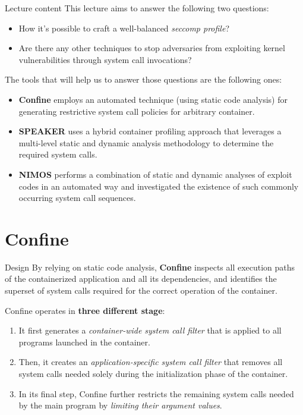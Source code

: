 \documentclass{beamer}
\begin{document}
\begin{frame}{Lecture content}
This lecture aims to answer the following two questions:
\begin{itemize}

 \item How it's possible to craft a well-balanced \emph{seccomp profile}?\\

 \item Are there any other techniques to stop adversaries from exploiting kernel vulnerabilities through system call invocations?
\end{itemize}
\vspace{0.3cm}
The tools that will help us to answer those questions are the following ones:

\begin{itemize}

 \item \textbf{Confine} employs an automated technique (using static code analysis) for generating restrictive system call policies for arbitrary container. \\

 \item \textbf{SPEAKER} uses a hybrid container profiling approach that leverages a multi-level static and dynamic analysis methodology to determine the required system calls.\\
 
 \item \textbf{NIMOS} performs a combination of static and dynamic analyses of exploit codes in an automated way and investigated the existence of such commonly occurring system call sequences.
\end{itemize}

\end{frame}

\section{Confine}

\begin{frame}{Design}
By relying on static code analysis, \textbf{Confine} inspects all execution paths of the containerized application and all its dependencies, and identifies the superset of system calls required for the correct operation of the container.

\vspace{0.35cm}
Confine operates in \textbf{three different stage}:
\begin{enumerate}
    \item It first generates a \emph{container-wide system call filter} that is applied to all programs launched in the container. 
    \item Then, it creates an \emph{application-specific system call filter} that removes all system calls needed solely during the initialization phase of the container.
    \item In its final step, Confine further restricts the remaining system calls needed by the main program by \emph{limiting their argument values}.
\end{enumerate}
\end{frame}
\end{document}
